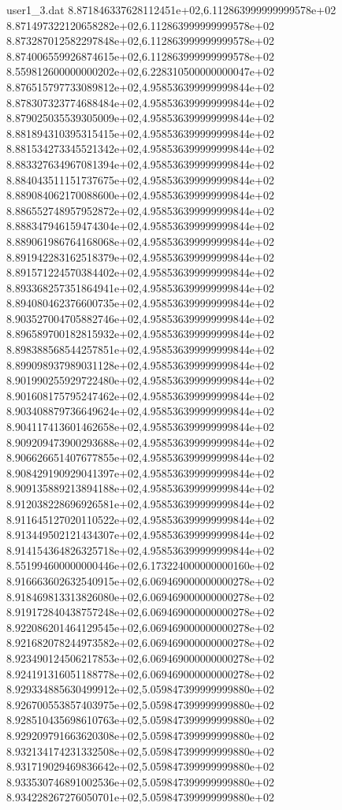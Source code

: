 \begin{filecontents}{user1_3.dat}
8.871846337628112451e+02,6.112863999999999578e+02
8.871497322120658282e+02,6.112863999999999578e+02
8.873287012582297848e+02,6.112863999999999578e+02
8.874006559926874615e+02,6.112863999999999578e+02
8.559812600000000202e+02,6.228310500000000047e+02
8.876515797733089812e+02,4.958536399999999844e+02
8.878307323774688484e+02,4.958536399999999844e+02
8.879025035539305009e+02,4.958536399999999844e+02
8.881894310395315415e+02,4.958536399999999844e+02
8.881534273345521342e+02,4.958536399999999844e+02
8.883327634967081394e+02,4.958536399999999844e+02
8.884043511151737675e+02,4.958536399999999844e+02
8.889084062170088600e+02,4.958536399999999844e+02
8.886552748957952872e+02,4.958536399999999844e+02
8.888347946159474304e+02,4.958536399999999844e+02
8.889061986764168068e+02,4.958536399999999844e+02
8.891942283162518379e+02,4.958536399999999844e+02
8.891571224570384402e+02,4.958536399999999844e+02
8.893368257351864941e+02,4.958536399999999844e+02
8.894080462376600735e+02,4.958536399999999844e+02
8.903527004705882746e+02,4.958536399999999844e+02
8.896589700182815932e+02,4.958536399999999844e+02
8.898388568544257851e+02,4.958536399999999844e+02
8.899098937989031128e+02,4.958536399999999844e+02
8.901990255929722480e+02,4.958536399999999844e+02
8.901608175795247462e+02,4.958536399999999844e+02
8.903408879736649624e+02,4.958536399999999844e+02
8.904117413601462658e+02,4.958536399999999844e+02
8.909209473900293688e+02,4.958536399999999844e+02
8.906626651407677855e+02,4.958536399999999844e+02
8.908429190929041397e+02,4.958536399999999844e+02
8.909135889213894188e+02,4.958536399999999844e+02
8.912038228696926581e+02,4.958536399999999844e+02
8.911645127020110522e+02,4.958536399999999844e+02
8.913449502121434307e+02,4.958536399999999844e+02
8.914154364826325718e+02,4.958536399999999844e+02
8.551994600000000446e+02,6.173224000000000160e+02
8.916663602632540915e+02,6.069469000000000278e+02
8.918469813313826080e+02,6.069469000000000278e+02
8.919172840438757248e+02,6.069469000000000278e+02
8.922086201464129545e+02,6.069469000000000278e+02
8.921682078244973582e+02,6.069469000000000278e+02
8.923490124506217853e+02,6.069469000000000278e+02
8.924191316051188778e+02,6.069469000000000278e+02
8.929334885630499912e+02,5.059847399999999880e+02
8.926700553857403975e+02,5.059847399999999880e+02
8.928510435698610763e+02,5.059847399999999880e+02
8.929209791663620308e+02,5.059847399999999880e+02
8.932134174231332508e+02,5.059847399999999880e+02
8.931719029469836642e+02,5.059847399999999880e+02
8.933530746891002536e+02,5.059847399999999880e+02
8.934228267276050701e+02,5.059847399999999880e+02

\end{filecontents}
